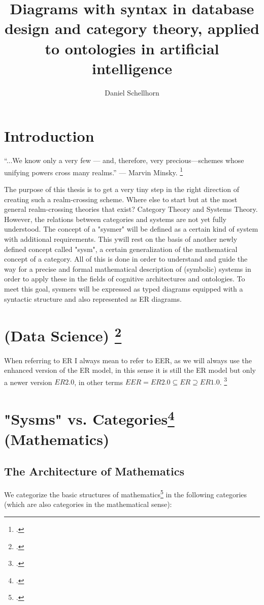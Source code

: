 \documentclass[12pt,a4paper, landscape]{article}
\title{Diagrams with syntax in database design and category theory, applied to ontologies in artificial intelligence }
\author{Daniel Schellhorn}
\begin{document}
\maketitle

\section*{Introduction}
“...We know only a very few — and, therefore, very precious—schemes whose unifying powers cross many realms.” — Marvin Minsky. \footcite[?]{Minsky1988}
\newline

The purpose of this thesis is to get a very tiny step in the right direction of creating such a realm-crossing scheme.  Where else to start but at the most general realm-crossing theories that exist? Category Theory and Systems Theory. However, the relations between categories and systems are not yet fully understood. The concept of a "sysmer" will be defined as a certain kind of system with additional requirements. This ywill rest on the basis of another newly defined concept called "sysm", a certain generalization of the mathematical concept of a category. All of this is done in order to understand and guide the way for a precise and formal mathematical description of (symbolic) systems in order to apply these in the fields of cognitive architectures and ontologies. To meet this goal, sysmers will be expressed as typed diagrams equipped with a syntactic structure and also represented as ER diagrams.
\section{ (Data Science) \footcite{ElmasriNavathe2015}}

When referring to ER I always mean to refer to EER, as we will always use the enhanced version of the ER model, in this sense it is still the ER model but only a newer version $ER 2.0$, in other terms $EER = ER 2.0 \subseteq ER \supseteq ER 1.0 $. \footcite[107]{ElmasriNavathe2015}

\section{"Sysms" vs. Categories\footcite{MacLane1997} (Mathematics)}

\subsection{The Architecture of Mathematics}
We categorize the basic structures of mathematics\footcite[68]{Basieux2000} in the following categories (which are also categories in the mathematical sense):
\end{document}
